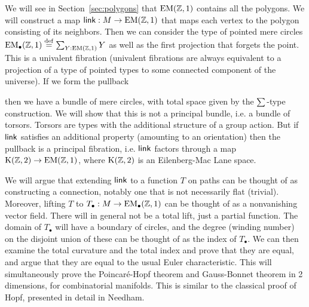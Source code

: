 We will see in Section~\ref{sec:polygons} that \( \mathrm{EM}(\mathbb{Z},1) \) contains all the polygons. We will construct a map \( \operatorname{\mathsf{link}}:M\to\mathrm{EM}(\mathbb{Z},1) \) that maps each vertex to the polygon consisting of its neighbors. Then we can consider the type of pointed mere circles \( \mathrm{EM_{\bullet}}(\mathbb{Z},1)\stackrel{\mathrm{def}}{=} \sum_{Y:\mathrm{EM}(\mathbb{Z},1)}Y \) as well as the first projection that forgets the point. This is a univalent fibration (univalent fibrations are always equivalent to a projection of a type of pointed types to some connected component of the universe\cite{christensen_univalence}). If we form the pullback
\begin{center}
\end{center}
then we have a bundle of mere circles, with total space given by the \( \sum_{} \)-type construction. We will show that this is not a principal bundle, i.e. a bundle of torsors. Torsors are types with the additional structure of a group action. But if \( \operatorname{\mathsf{link}}  \) satisfies an additional property (amounting to an orientation) then the pullback is a principal fibration, i.e. \( \operatorname{\mathsf{link}} \) factors through a map \( \mathrm{K}(\mathbb{Z},2)\to\mathrm{EM}(\mathbb{Z},1) \), where \( \mathrm{K}(\mathbb{Z},2) \) is an Eilenberg-Mac Lane space. 

We will argue that extending \( \operatorname{\mathsf{link}} \) to a function \( T \) on paths can be thought of as constructing a connection, notably one that is not necessarily flat (trivial). Moreover, lifting \( T \) to \( T_\bullet:M\to\mathrm{EM_{\bullet}}(\mathbb{Z},1) \) can be thought of as a nonvanishing vector field. There will in general not be a total lift, just a partial function. The domain of \( T_\bullet \) will have a boundary of circles, and the degree (winding number) on the disjoint union of these can be thought of as the index of \( T_\bullet \). We can then examine the total curvature and the total index and prove that they are equal, and argue that they are equal to the usual Euler characteristic. This will simultaneously prove the Poincaré-Hopf theorem and Gauss-Bonnet theorem in 2 dimensions, for combinatorial manifolds. This is similar to the classical proof of Hopf\cite{hopf}, presented in detail in Needham\cite{needham}.

